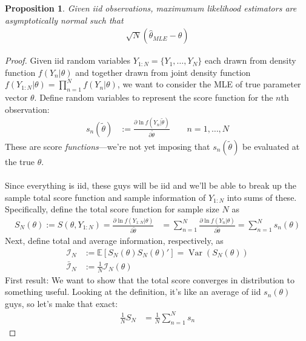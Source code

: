 \documentclass[12pt]{article}
\theoremstyle{plain}
\newtheorem{prop}[thm]{Proposition}
\theoremstyle{definition}
\theoremstyle{remark}
\newcommand{\calI}{\mathcal{I}}
\newcommand{\E}{\mathbb{E}}
\newcommand{\Var}{\operatorname{Var}}
\newcommand{\sumnN}{\sum^N_{n=1}}
\newcommand{\prodnN}{\prod^N_{n=1}}
\begin{document}
\begin{prop}
Given iid observations, maximumum likelihood estimators are
asymptotically normal such that
\begin{align*}
  \sqrt{N}(\hat{\theta}_{MLE}-\theta)
\end{align*}
\end{prop}
\begin{proof}
Given iid random variables $Y_{1:N}=\{Y_1,\ldots,Y_N\}$ each drawn from
density function $f(Y_n|\theta)$ and together drawn from joint density
function $f(Y_{1:N}|\theta)=\prodnN f(Y_n|\theta)$, we want to consider
the MLE of true parameter vector $\theta$. Define random variables to
represent the score function for the $n$th observation:
\begin{align*}
  s_n(\tilde{\theta}) &:=
  \frac{\partial \ln f(Y_n|\tilde{\theta})}{\partial \tilde{\theta}}
  \qquad n = 1,\ldots,N
\end{align*}
These are score \emph{functions}---we're not yet imposing that
$s_n(\tilde{\theta})$ be evaluated at the true $\theta$.
\\
\\
Since everything is iid, these guys will be iid and we'll be able to
break up the sample total score function and sample information of
$Y_{1:N}$ into sums of these. Specifically, define the total score
function for sample size $N$ as
\begin{align*}
  S_N(\theta):= S(\theta,Y_{1:N})
  = \frac{\partial \ln f(Y_{1:N}|\theta)}{\partial \tilde{\theta}}
  &= \sumnN \frac{\partial \ln f(Y_n|\theta)}{\partial \tilde{\theta}}
  = \sumnN s_n(\theta)
\end{align*}
Next, define total and average information, respectively, as
\begin{align*}
  \calI_N &:= \E[S_N(\theta) S_N(\theta)'] = \Var(S_N(\theta))
  \\
  \bar{\calI}_N &:= \frac{1}{N}\calI_N(\theta)
\end{align*}
First result: We want to show that the total score converges in
distribution to something useful. Looking at the definition, it's like
an average of iid $s_n(\theta)$ guys, so let's make that exact:
\begin{align*}
  \frac{1}{N}S_N &= \frac{1}{N} \sumnN s_n
\end{align*}

\end{proof}
\end{document}
